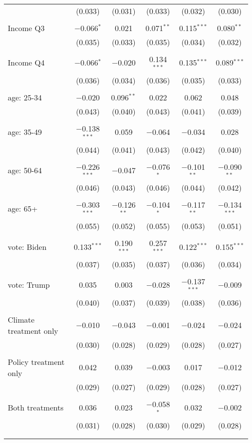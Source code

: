 \begin{tabular}{@{\extracolsep{5pt}}lccccc}
  & (0.033) & (0.031) & (0.033) & (0.032) & (0.030) \\ 
  & & & & & \\ 
 Income Q3 & $-$0.066$^{*}$ & 0.021 & 0.071$^{**}$ & 0.115$^{***}$ & 0.080$^{**}$ \\ 
  & (0.035) & (0.033) & (0.035) & (0.034) & (0.032) \\ 
  & & & & & \\ 
 Income Q4 & $-$0.066$^{*}$ & $-$0.020 & 0.134$^{***}$ & 0.135$^{***}$ & 0.089$^{***}$ \\ 
  & (0.036) & (0.034) & (0.036) & (0.035) & (0.033) \\ 
  & & & & & \\ 
 age: 25-34 & $-$0.020 & 0.096$^{**}$ & 0.022 & 0.062 & 0.048 \\ 
  & (0.043) & (0.040) & (0.043) & (0.041) & (0.039) \\ 
  & & & & & \\ 
 age: 35-49 & $-$0.138$^{***}$ & 0.059 & $-$0.064 & $-$0.034 & 0.028 \\ 
  & (0.044) & (0.041) & (0.043) & (0.042) & (0.040) \\ 
  & & & & & \\ 
 age: 50-64 & $-$0.226$^{***}$ & $-$0.047 & $-$0.076$^{*}$ & $-$0.101$^{**}$ & $-$0.090$^{**}$ \\ 
  & (0.046) & (0.043) & (0.046) & (0.044) & (0.042) \\ 
  & & & & & \\ 
 age: 65+ & $-$0.303$^{***}$ & $-$0.126$^{**}$ & $-$0.104$^{*}$ & $-$0.117$^{**}$ & $-$0.134$^{***}$ \\ 
  & (0.055) & (0.052) & (0.055) & (0.053) & (0.051) \\ 
  & & & & & \\ 
 vote: Biden & 0.133$^{***}$ & 0.190$^{***}$ & 0.257$^{***}$ & 0.122$^{***}$ & 0.155$^{***}$ \\ 
  & (0.037) & (0.035) & (0.037) & (0.036) & (0.034) \\ 
  & & & & & \\ 
 vote: Trump & 0.035 & 0.003 & $-$0.028 & $-$0.137$^{***}$ & $-$0.009 \\ 
  & (0.040) & (0.037) & (0.039) & (0.038) & (0.036) \\ 
  & & & & & \\ 
 Climate treatment only & $-$0.010 & $-$0.043 & $-$0.001 & $-$0.024 & $-$0.024 \\ 
  & (0.030) & (0.028) & (0.029) & (0.028) & (0.027) \\ 
  & & & & & \\ 
 Policy treatment only & 0.042 & 0.039 & $-$0.003 & 0.017 & $-$0.012 \\ 
  & (0.029) & (0.027) & (0.029) & (0.028) & (0.027) \\ 
  & & & & & \\ 
 Both treatments & 0.036 & 0.023 & $-$0.058$^{*}$ & 0.032 & $-$0.002 \\ 
  & (0.031) & (0.028) & (0.030) & (0.029) & (0.028) \\ 
  & & & & & \\ 
\hline \\[-1.8ex] 


\end{tabular}

